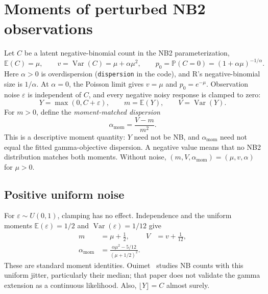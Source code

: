 \documentclass[11pt]{article}
\newcommand{\E}{\mathbb{E}}
\newcommand{\Var}{\operatorname{Var}}
\newcommand{\Prob}{\mathbb{P}}
\begin{document}
\section{Moments of perturbed NB2 observations}
\label{sec:nb2-noise-moments}

Let $C$ be a latent negative-binomial count in the NB2 parameterization,
\begin{equation}
  \E(C)=\mu,\qquad v=\Var(C)=\mu+\alpha\mu^2,\qquad
  p_0=\Prob(C=0)=(1+\alpha\mu)^{-1/\alpha}.
\end{equation}
Here $\alpha>0$ is overdispersion (\texttt{dispersion} in the code),
and R's negative-binomial size is $1/\alpha$. At $\alpha=0$, the
Poisson limit gives $v=\mu$ and $p_0=e^{-\mu}$. Observation noise $\varepsilon$
is independent of $C$, and every negative noisy response is clamped to zero:
\begin{equation}
  Y=\max(0,C+\varepsilon),\qquad m=\E(Y),\qquad V=\Var(Y).
\end{equation}
For $m>0$, define the \emph{moment-matched dispersion}
\begin{equation}
  \alpha_{\mathrm{mom}}=\frac{V-m}{m^2}.
  \label{eq:moment-dispersion}
\end{equation}
This is a descriptive moment quantity: $Y$ need not be NB, and
$\alpha_{\mathrm{mom}}$ need not equal the fitted gamma-objective dispersion.
A negative value means that no NB2 distribution matches both moments.
Without noise, $(m,V,\alpha_{\mathrm{mom}})=(\mu,v,\alpha)$ for $\mu>0$.

\subsection{Positive uniform noise}
For $\varepsilon\sim U(0,1)$, clamping has no effect. Independence and the
uniform moments $\E(\varepsilon)=1/2$ and $\Var(\varepsilon)=1/12$ give
\begin{align}
  m&=\mu+\frac12, & V&=v+\frac1{12},\\
  \alpha_{\mathrm{mom}}
   &=\frac{\alpha\mu^2-5/12}{(\mu+1/2)^2}.
\end{align}
These are standard moment identities. Ouimet~\cite{ouimet2023} studies
NB counts with this uniform jitter, particularly their median; that paper
does not validate the gamma extension as a continuous likelihood.
Also, $\lfloor Y\rfloor=C$ almost surely.
\end{document}
